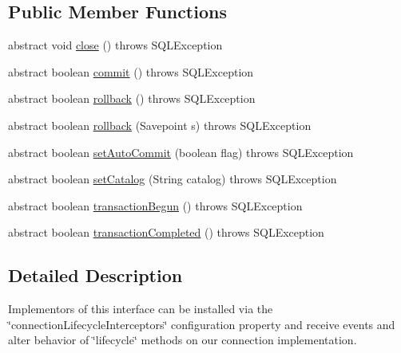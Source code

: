 \subsection*{Public Member Functions}
\begin{DoxyCompactItemize}
\item 
abstract void \mbox{\hyperlink{interfacecom_1_1mysql_1_1jdbc_1_1_connection_lifecycle_interceptor_a73675852c009a064292c1ae98d7caeb7}{close}} ()  throws S\+Q\+L\+Exception
\item 
abstract boolean \mbox{\hyperlink{interfacecom_1_1mysql_1_1jdbc_1_1_connection_lifecycle_interceptor_ac8f559b2bf353ede24b6845d5edeeeb0}{commit}} ()  throws S\+Q\+L\+Exception
\item 
abstract boolean \mbox{\hyperlink{interfacecom_1_1mysql_1_1jdbc_1_1_connection_lifecycle_interceptor_a1e23e5b6724c8362009e5d87938507de}{rollback}} ()  throws S\+Q\+L\+Exception
\item 
abstract boolean \mbox{\hyperlink{interfacecom_1_1mysql_1_1jdbc_1_1_connection_lifecycle_interceptor_ad7d4ade6867189eceeaad2c062aff0ee}{rollback}} (Savepoint s)  throws S\+Q\+L\+Exception
\item 
abstract boolean \mbox{\hyperlink{interfacecom_1_1mysql_1_1jdbc_1_1_connection_lifecycle_interceptor_af86c9f877791fe2dded81722568863b7}{set\+Auto\+Commit}} (boolean flag)  throws S\+Q\+L\+Exception
\item 
abstract boolean \mbox{\hyperlink{interfacecom_1_1mysql_1_1jdbc_1_1_connection_lifecycle_interceptor_a1b4e6d4cd345e6ac103df4cc0d6807a1}{set\+Catalog}} (String catalog)  throws S\+Q\+L\+Exception
\item 
abstract boolean \mbox{\hyperlink{interfacecom_1_1mysql_1_1jdbc_1_1_connection_lifecycle_interceptor_accfde1498fb7224e65b1557ff9efe873}{transaction\+Begun}} ()  throws S\+Q\+L\+Exception
\item 
abstract boolean \mbox{\hyperlink{interfacecom_1_1mysql_1_1jdbc_1_1_connection_lifecycle_interceptor_a439077fdf5cb12487a9689838a1983e6}{transaction\+Completed}} ()  throws S\+Q\+L\+Exception
\end{DoxyCompactItemize}


\subsection{Detailed Description}
Implementors of this interface can be installed via the \char`\"{}connection\+Lifecycle\+Interceptors\char`\"{} configuration property and receive events and alter behavior of \char`\"{}lifecycle\char`\"{} methods on our connection implementation.

